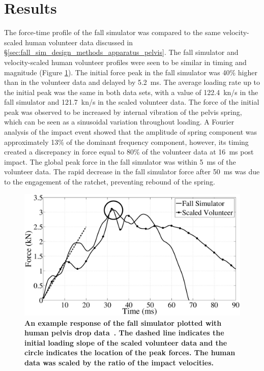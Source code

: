 \section{Results}
\label{sec:fall_sim_design_results}
The force-time profile of the fall simulator was compared to the same velocity-scaled human volunteer data discussed in \S\ref{sec:fall_sim_design_methods_apparatus_pelvis}.
The fall simulator and velocity-scaled human volunteer profiles were seen to be similar in timing and magnitude (Figure \ref{fig:CompareToLaing}).
The initial force peak in the fall simulator was 40\% higher than in the volunteer data and delayed by 5.2~\ac{ms}.
The average loading rate up to the initial peak was the same in both data sets, with a value of 122.4~\ac{kn}/\ac{s} in the fall simulator and 121.7~\ac{kn}/\ac{s} in the scaled volunteer data.
The force of the initial peak was observed to be increased by internal vibration of the pelvis spring, which can be seen as a sinusoidal variation throughout loading.
A Fourier analysis of the impact event showed that the amplitude of spring component was approximately 13\% of the dominant frequency component, however, its timing created a discrepancy in force equal to 80\% of the volunteer data at 16~\ac{ms} post impact.
The global peak force in the fall simulator was within 5~\ac{ms} of the volunteer data.
The rapid decrease in the fall simulator force after 50~\ac{ms} was due to the engagement of the ratchet, preventing rebound of the spring.

\begin{figure}
	\centering
	\includegraphics[width=1\linewidth]{./impactor/figures/CompareToLaing2010_VelocityScaled.eps}
	\caption[Fall simulator data compared to a human volunteer]{\textbf{An example response of the fall simulator plotted with human pelvis drop data~\citep{laing_characterizing_2010}.
	The dashed line indicates the initial loading slope of the scaled volunteer data and the circle indicates the location of the peak forces.
	The human data was scaled by the ratio of the impact velocities.}}
	\label{fig:CompareToLaing}
\end{figure}

